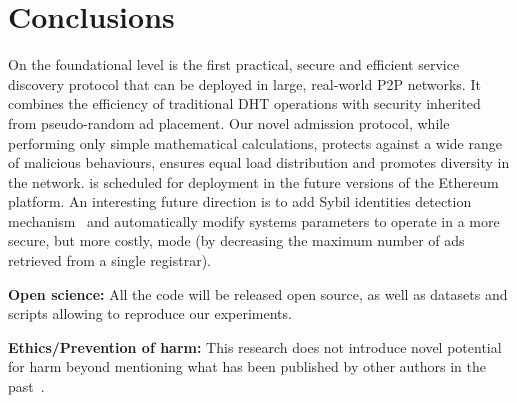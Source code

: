 
\section{Conclusions}
\label{sec:con}
On the foundational level \sysname is the first practical, secure and efficient service discovery protocol that can be deployed in large, real-world P2P networks. It combines the efficiency of traditional DHT operations with security inherited from pseudo-random ad placement. Our novel admission protocol, while performing only simple mathematical calculations, protects against a wide range of malicious behaviours, ensures equal load distribution and promotes diversity in the network.
\sysname is scheduled for deployment in the future versions of the Ethereum platform. 
An interesting future direction is to add Sybil identities detection mechanism~\cite{cholez2010efficient} and automatically modify systems parameters to operate in a more secure, but more costly, mode (\eg by decreasing the maximum number of ads retrieved from a single registrar). 


{\footnotesize

\smallskip

\noindent
\textbf{Open science:} All the code will be released open source, as well as datasets and scripts allowing to reproduce our experiments.

\smallskip

\footnotesize
\noindent
\textbf{Ethics/Prevention of harm:} This research does not introduce novel potential for harm beyond mentioning what has been published by other authors in the past~\cite{marcus2018low,henningsen2019eclipsing}.
}